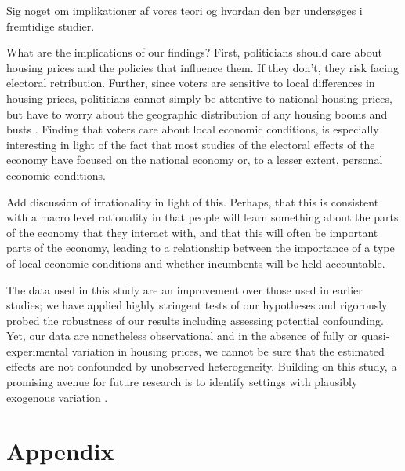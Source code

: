 \documentclass[12pt,a4paper]{article}
\begin{document}
	
	Sig noget om implikationer af vores teori og hvordan den bør undersøges i fremtidige studier.
	
	What are the implications of our findings? First, politicians should care about housing prices and the policies that influence them. If they don’t, they risk facing electoral retribution. Further, since voters are sensitive to  local differences in housing prices, politicians cannot simply be attentive to national housing prices, but have to worry about the geographic distribution of any housing booms and busts \citep[cf.][11]{ferejohn1986incumbent}. Finding that voters care about local economic conditions, is especially interesting in light of the fact that most studies of the electoral effects of the economy have focused on the national economy or, to a lesser extent, personal economic conditions.
	
	Add discussion of irrationality in light of this. Perhaps, that this is consistent with a macro level rationality in that people will learn something about the parts of the economy that they interact with, and that this will often be important parts of the economy, leading to a relationship between the importance of a type of local economic conditions and whether incumbents will be held accountable.
	
	The data used in this study are an improvement over those used in earlier studies; we have applied highly stringent tests of our hypotheses and rigorously probed the robustness of our results including assessing potential confounding. Yet, our data are nonetheless observational and in the absence of fully or quasi-experimental variation in housing prices, we cannot be sure that the estimated effects are not confounded by unobserved heterogeneity. Building on this study, a promising avenue for future research is to identify settings with plausibly exogenous variation \citep[cf.]{jerzak2016property}.
	
	
	
	
	
	
	
	
	
	
	
	\clearpage
	
	\singlespacing
	
	
	
	
	\newpage
	
	\appendix
	\section*{Appendix}
		\onehalfspacing
	\renewcommand{\thesubsection}{\Alph{subsection}}
	\renewcommand{\thetable}{\Alph{subsection}\arabic{table}}
	\renewcommand{\thefigure}{\Alph{subsection}\arabic{figure}}
	
\end{document}
